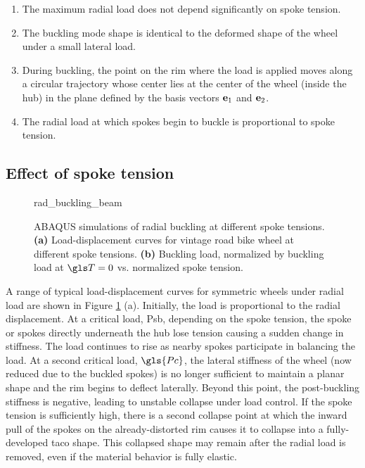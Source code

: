 \documentclass[\rootdir/thesis.tex]{subfiles}
\begin{document}
\begin{enumerate}
\item{The maximum radial load does not depend significantly on spoke tension.}\label{assum:no_T_effect}
\item{The buckling mode shape is identical to the deformed shape of the wheel under a small lateral load.}\label{assum:lat_shape}
\item{During buckling, the point on the rim where the load is applied moves along a circular trajectory whose center lies at the center of the wheel (inside the hub) in the plane defined by the basis vectors $\mathbf{e}_1$ and $\mathbf{e}_2$.}\label{assum:circ_path}
\item{The radial load at which spokes begin to buckle is proportional to spoke tension.}\label{assum:Psb_T}
\end{enumerate}

\subsection{Effect of spoke tension}

\begin{figure}[t]
\centering
{rad_buckling_beam}
\caption{ABAQUS simulations of radial buckling at different spoke tensions. \textbf{(a)} Load-displacement curves for vintage road bike wheel at different spoke tensions. \textbf{(b)} Buckling load, normalized by buckling load at $\T=0$ vs. normalized spoke tension.}
\label{fig:rad_buckling_beam}
\end{figure}

A range of typical load-displacement curves for symmetric wheels under radial load are shown in Figure \ref{fig:rad_buckling_beam} (a). Initially, the load is proportional to the radial displacement. At a critical load, \gls{Psb}, depending on the spoke tension, the spoke or spokes directly underneath the hub lose tension causing a sudden change in stiffness. The load continues to rise as nearby spokes participate in balancing the load. At a second critical load, $\gls{Pc}$, the lateral stiffness of the wheel (now reduced due to the buckled spokes) is no longer sufficient to maintain a planar shape and the rim begins to deflect laterally. Beyond this point, the post-buckling stiffness is negative, leading to unstable collapse under load control. If the spoke tension is sufficiently high, there is a second collapse point at which the inward pull of the spokes on the already-distorted rim causes it to collapse into a fully-developed taco shape. This collapsed shape may remain after the radial load is removed, even if the material behavior is fully elastic.
\end{document}
